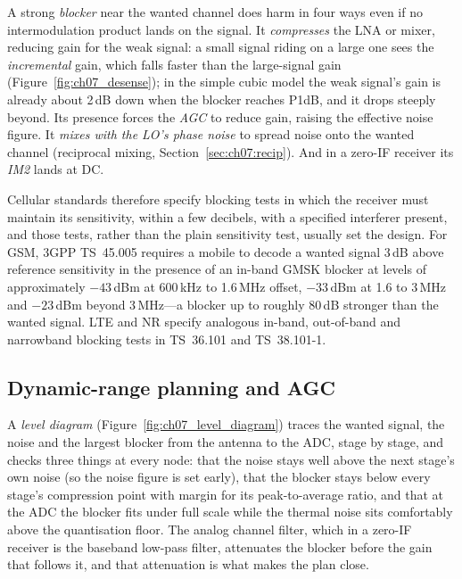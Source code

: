 A strong \emph{blocker} near the wanted channel does harm in four ways even if no intermodulation
product lands on the signal. It \emph{compresses} the LNA or mixer, reducing gain for the weak signal:
a small signal riding on a large one sees the \emph{incremental} gain, which falls faster than the
large-signal gain (Figure~\ref{fig:ch07_desense}); in the simple cubic model the weak signal's gain is
already about 2\,dB down when the blocker reaches P1dB, and it drops steeply beyond. Its presence
forces the \emph{AGC} to reduce gain, raising the effective noise figure. It \emph{mixes with the LO's
phase noise} to spread noise onto the wanted channel (reciprocal mixing, Section~\ref{sec:ch07:recip}).
And in a zero-IF receiver its \emph{IM2} lands at DC.


Cellular standards therefore specify blocking tests in which the receiver must maintain its
sensitivity, within a few decibels, with a specified interferer present, and those tests, rather than
the plain sensitivity test, usually set the design. For GSM, 3GPP TS~45.005 requires a mobile to decode a
wanted signal 3\,dB above reference sensitivity in the presence of an in-band GMSK blocker at levels of
approximately $-43$\,dBm at 600\,kHz to 1.6\,MHz offset, $-33$\,dBm at 1.6 to 3\,MHz and $-23$\,dBm beyond
3\,MHz---a blocker up to roughly 80\,dB stronger than the wanted signal. LTE and NR specify analogous
in-band, out-of-band and narrowband blocking tests in TS~36.101 and TS~38.101-1.

\subsection{Dynamic-range planning and AGC}
\label{sec:ch07:agc}

A \emph{level diagram} (Figure~\ref{fig:ch07_level_diagram}) traces the wanted signal, the noise and the
largest blocker from the antenna to the ADC, stage by stage, and checks three things at every node:
that the noise stays well above the next stage's own noise (so the noise figure is set early), that the
blocker stays below every stage's compression point with margin for its peak-to-average ratio, and that
at the ADC the blocker fits under full scale while the thermal noise sits comfortably above the
quantisation floor. The analog channel filter, which in a zero-IF receiver is the baseband low-pass
filter, attenuates the blocker before the gain that follows it, and that attenuation is what makes the
plan close.

